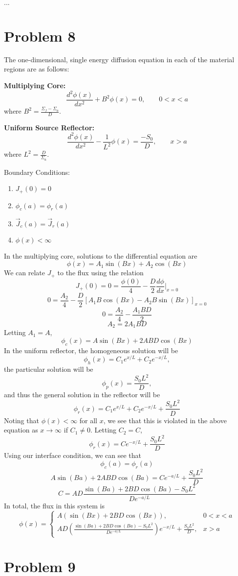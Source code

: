 \documentclass{article}
\newcommand{\Xs}{\Sigma}
\newcommand{\cur}{\vec{J}}
\begin{document}
...


\section*{Problem 8}

The one-dimensional, single energy diffusion equation in each of the material regions are as follows:

\textbf{Multiplying Core:}
$$ \frac{d^2\phi(x)}{dx^2} + B^2\phi(x) = 0 , \qquad 0 < x < a $$
where $B^2 = \frac{\Xs_f - \Xs_a}{D}.$ 

\textbf{Uniform Source Reflector:}
$$ \frac{d^2\phi(x)}{dx^2} - \frac{1}{L^2}\phi(x) = \frac{-S_0}{D}, \qquad x > a $$
where $L^2 = \frac{D}{\Xs_a}$.

Boundary Conditions:
\begin{enumerate}
\item $ J_+(0) = 0 $
\item $ \phi_c(a) = \phi_r(a) $
\item $ \cur_c(a) = \cur_r(a) $
\item $ \phi(x) < \infty $
\end{enumerate}

In the multiplying core, solutions to the differential equation are
$$ \phi(x) = A_1\sin(Bx) + A_2\cos(Bx) $$
We can relate $J_+$ to the flux using the relation
$$ J_+(0) = 0 = \frac{\phi(0)}{4} - \frac{D}{2}\frac{d\phi}{dx}\bigg|_{x=0} $$
$$ 0 = \frac{A_2}{4} - \frac{D}{2}\left[A_1 B \cos(Bx) - A_2 B \sin(Bx)\right]_{x=0} $$
$$ 0 = \frac{A_2}{4} - \frac{A_1 B D}{2} $$
$$ A_2 = 2 A_1 B D $$
Letting $A_1 = A$,
$$ \phi_c(x) = A\sin(Bx) + 2ABD\cos(Bx) $$
In the uniform reflector, the homogeneous solution will be
$$ \phi_h(x) = C_1 e^{x/L} + C_2 e^{-x/L} ,$$
the particular solution will be
$$ \phi_p(x) = \frac{S_0L^2}{D} ,$$
and thus the general solution in the reflector will be
$$ \phi_r(x) = C_1 e^{x/L} + C_2 e^{-x/L} + \frac{S_0L^2}{D} $$
Noting that $\phi(x) < \infty$ for all $x$, we see that this is violated in the above equation as $x \rightarrow \infty$ if $C_1 \neq 0$. Letting $C_2 = C$, 
$$ \phi_r(x) = C e^{-x/L} + \frac{S_0L^2}{D} $$
Using our interface condition, we can see that 
$$ \phi_c(a) = \phi_r(a) $$
$$ A\sin(Ba) + 2ABD\cos(Ba) = C e^{-a/L} + \frac{S_0L^2}{D} $$ 
$$ C = AD \frac{\sin(Ba) + 2BD\cos(Ba) - S_0L^2}{De^{-a/L}} $$
In total, the flux in this system is
$$\boxed{ \phi(x) = \begin{cases} 	A \left( \sin(Bx) + 2 BD \cos(Bx) \right), & 0<x<a \\
							AD\left( \frac{\sin(Ba) + 2BD\cos(Ba) - S_0L^2}{De^{-a/L}}\right) e^{-x/L} + \frac{S_0L^2}{D}, & x > a \end{cases} }$$



\section*{Problem 9}




\end{document}
